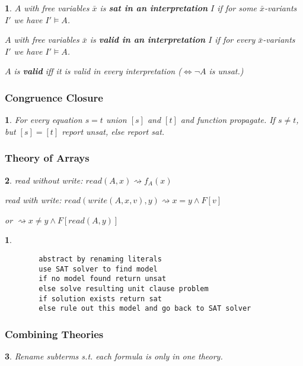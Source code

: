 \documentclass[9pt]{extarticle}
\theoremstyle{theoremstyle}
\newtheorem*{green}{}
\newtheorem*{red}{}
\newtheorem*{blue}{}
\begin{document}
\begin{multicols}{3}
\begin{minipage}[t]{.30\textwidth}
\begin{green}
$A$ with free variables $\bar{x}$ is \textbf{sat in an interpretation} $I$ if for some $\bar{x}$-variants $I'$ we have $I'\models A$.

$A$ with free variables $\bar{x}$ is \textbf{valid in an interpretation} $I$ if for every $\bar{x}$-variants $I'$ we have $I'\models A$.

$A$ is \textbf{valid} iff it is valid in every interpretation ($\iff \lnot A$ is unsat.)
\end{green}

\subsubsection*{Congruence Closure}
\begin{blue}
	For every equation $s=t$ union $[s]$ and $[t]$ and function propagate. If $s \not= t$, but $[s] = [t]$ report unsat, else report sat.
\end{blue}

\subsubsection*{Theory of Arrays}
\begin{blue}
	read without write: $read(A,x) \rightsquigarrow f_A(x)$
	
	read with write: $read(write(A,x,v),y) \rightsquigarrow x=y \land F[v]$
	
	or \hspace{4cm} $\rightsquigarrow x\not= y \land F[read(A,y)]$
\end{blue}



\end{minipage}\hfil

\begin{minipage}[t]{.30\textwidth}

\begin{red}
	\begin{verbatim}
		abstract by renaming literals
		use SAT solver to find model
		if no model found return unsat
		else solve resulting unit clause problem
		if solution exists return sat
		else rule out this model and go back to SAT solver
	\end{verbatim}
\end{red}

\subsubsection*{Combining Theories}
\begin{blue}
Rename subterms s.t. each formula is only in one theory.


\end{blue}
\end{minipage}
\end{multicols}
\end{document}
